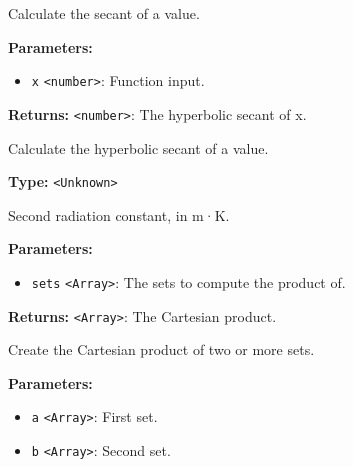 \documentclass[12pt,a4paper]{article}
\begin{document}
\noindent Calculate the secant of a value.

\vspace{5mm}
\noindent {}


\noindent \textbf{Parameters:}
\begin{itemize}
  \item \texttt{x} \texttt{<number>}: Function input.
\end{itemize}

\noindent \textbf{Returns:} \texttt{<number>}: The hyperbolic secant of x.

\noindent Calculate the hyperbolic secant of a value.

\vspace{5mm}
\noindent {}\vspace{4mm}


\noindent \textbf{Type:} \texttt{<Unknown>}

\noindent Second radiation constant, in m·K.

\vspace{5mm}
\noindent {}


\noindent \textbf{Parameters:}
\begin{itemize}
  \item \texttt{sets} \texttt{<Array>}: The sets to compute the product of.
\end{itemize}

\noindent \textbf{Returns:} \texttt{<Array>}: The Cartesian product.

\noindent Create the Cartesian product of two or more sets.

\vspace{5mm}
\noindent {}


\noindent \textbf{Parameters:}
\begin{itemize}
  \item \texttt{a} \texttt{<Array>}: First set.
  \item \texttt{b} \texttt{<Array>}: Second set.
\end{itemize}
\end{document}
